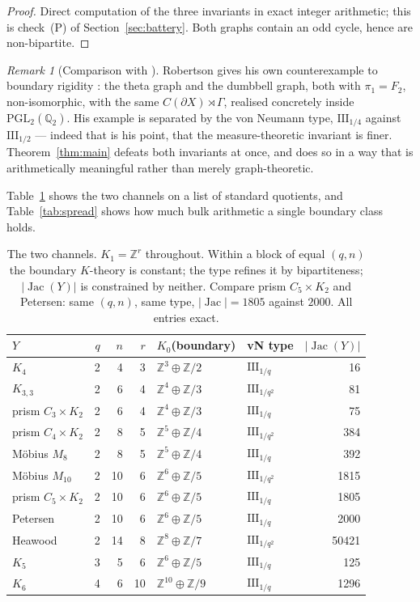 \documentclass[11pt]{article}
\theoremstyle{plain}
\theoremstyle{remark}
\newtheorem{remark}[theorem]{Remark}
\newcommand{\Z}{\mathbb{Z}}
\newcommand{\Jac}{\operatorname{Jac}}
\newcommand{\III}{\mathrm{III}}
\begin{document}
\begin{proof}
Direct computation of the three invariants in exact integer arithmetic; this is check~(P)
of Section~\ref{sec:battery}. Both graphs contain an odd cycle, hence are non-bipartite.
\end{proof}

\begin{remark}[Comparison with \cite{Rob05}]\label{rem:compare}
Robertson gives his own counterexample to boundary rigidity \cite[Ex.~1.5]{Rob05}: the
theta graph and the dumbbell graph, both with $\pi_1=F_2$, non-isomorphic, with the same
$C(\partial X)\rtimes\Gamma$, realised concretely inside $\mathrm{PGL}_2(\mathbb Q_2)$. His
example is separated by the von Neumann type, $\III_{1/4}$ against $\III_{1/2}$ --- indeed
that is his point, that the measure-theoretic invariant is finer. Theorem~\ref{thm:main}
defeats both invariants at once, and does so in a way that is arithmetically meaningful
rather than merely graph-theoretic.
\end{remark}

Table~\ref{tab:named} shows the two channels on a list of standard quotients, and
Table~\ref{tab:spread} shows how much bulk arithmetic a single boundary class holds.

\begin{table}[ht]
\centering\small
\begin{tabular}{lrrrllr}
\toprule
$Y$ & $q$ & $n$ & $r$ & $K_0$(boundary) & vN type & $|\Jac(Y)|$\\
\midrule
$K_4$            & 2 &  4 &  3 & $\Z^3\oplus\Z/2$    & $\III_{1/q}$   & 16\\
$K_{3,3}$        & 2 &  6 &  4 & $\Z^4\oplus\Z/3$    & $\III_{1/q^2}$ & 81\\
prism $C_3\times K_2$ & 2 & 6 & 4 & $\Z^4\oplus\Z/3$ & $\III_{1/q}$   & 75\\
prism $C_4\times K_2$ & 2 & 8 & 5 & $\Z^5\oplus\Z/4$ & $\III_{1/q^2}$ & 384\\
M\"obius $M_8$   & 2 &  8 &  5 & $\Z^5\oplus\Z/4$    & $\III_{1/q}$   & 392\\
M\"obius $M_{10}$& 2 & 10 &  6 & $\Z^6\oplus\Z/5$    & $\III_{1/q^2}$ & 1815\\
prism $C_5\times K_2$ & 2 & 10 & 6 & $\Z^6\oplus\Z/5$ & $\III_{1/q}$  & 1805\\
Petersen         & 2 & 10 &  6 & $\Z^6\oplus\Z/5$    & $\III_{1/q}$   & 2000\\
Heawood          & 2 & 14 &  8 & $\Z^8\oplus\Z/7$    & $\III_{1/q^2}$ & 50421\\
$K_5$            & 3 &  5 &  6 & $\Z^6\oplus\Z/5$    & $\III_{1/q}$   & 125\\
$K_6$            & 4 &  6 & 10 & $\Z^{10}\oplus\Z/9$ & $\III_{1/q}$   & 1296\\
\bottomrule
\end{tabular}
\caption{The two channels. $K_1=\Z^r$ throughout. Within a block of equal $(q,n)$ the
boundary $K$-theory is constant; the type refines it by bipartiteness; $|\Jac(Y)|$ is
constrained by neither. Compare prism $C_5\times K_2$ and Petersen: same $(q,n)$, same
type, $|\Jac|=1805$ against $2000$. All entries exact.}
\label{tab:named}
\end{table}
\end{document}
